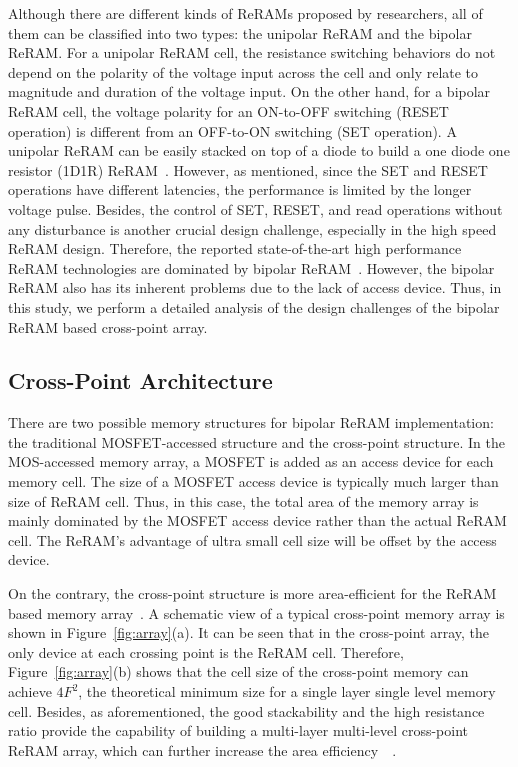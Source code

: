Although there are different kinds of ReRAMs proposed by researchers, all of them can be classified into two types: the unipolar ReRAM and the bipolar ReRAM. For a unipolar ReRAM cell, the resistance switching behaviors do not depend on the polarity of the voltage input across the cell and only relate to magnitude and duration of the voltage input. On the other hand, for a bipolar ReRAM cell, the voltage polarity for an ON-to-OFF switching (RESET operation) is different from an OFF-to-ON switching (SET operation). A unipolar ReRAM can be easily stacked on top of a diode to build a one diode one resistor (1D1R) ReRAM~\cite{memristor:1D1R}. However, as mentioned, since the SET and RESET operations have different latencies, the performance is limited by the longer voltage pulse. Besides, the control of SET, RESET, and read operations without any disturbance is another crucial design challenge, especially in the high speed ReRAM design. Therefore, the reported state-of-the-art high performance ReRAM technologies are dominated by bipolar ReRAM~\cite{ReRAM_IEDM2010_Kim,ReRAM_ISSCC2011_Sheu,ReRAM_ISSCC2011_Otsuka}. However, the bipolar ReRAM also has its inherent problems due to the lack of access device. Thus, in this study, we perform a detailed analysis of the design challenges of the bipolar ReRAM based cross-point array.

\subsection{Cross-Point Architecture}
There are two possible memory structures for bipolar ReRAM implementation: the traditional MOSFET-accessed structure and the cross-point structure. In the MOS-accessed memory array, a MOSFET is added as an access device for each memory cell. The size of a MOSFET access device is typically much larger than size of ReRAM cell. Thus, in this case, the total area of the memory array is mainly dominated by the MOSFET access device rather than the actual ReRAM cell. The ReRAM's advantage of ultra small cell size will be offset by the access device.

On the contrary, the cross-point structure is more area-efficient for the ReRAM based memory array~\cite{memristor:Cong}. A schematic view of a typical cross-point memory array is shown in Figure~\ref{fig:array}(a). It can be seen that in the cross-point array, the only device at each crossing point is the ReRAM cell. Therefore, Figure~\ref{fig:array}(b) shows that the cell size of the cross-point memory can achieve $4F^2$, the theoretical minimum size for a single layer single level memory cell. Besides, as aforementioned, the good stackability and the high resistance ratio provide the capability of building a multi-layer multi-level cross-point ReRAM array, which can further increase the area efficiency~\cite{ReRAM_ISSCC2011_Sheu}~\cite{memristor:IEDM08_3D}.

